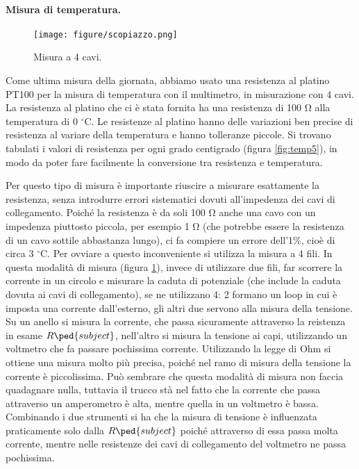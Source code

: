 \paragraph{Misura di temperatura.}

\begin{figure}
    \centering
    \texttt{[image: figure/scopiazzo.png]}
    \caption{Misura a 4 cavi.}
    \label{fig:scopiazzo5}
\end{figure}

Come ultima misura della giornata, abbiamo usato una resistenza al platino PT100 per la misura di temperatura con il multimetro,
in misurazione con 4 cavi. La resistenza al platino che ci è stata fornita ha una resistenza di 100 \si{\ohm} alla temperatura
di 0 $^\circ$C. Le resistenze al platino hanno delle variazioni ben precise di resistenza al variare della temperatura e hanno
tolleranze piccole. Si trovano tabulati i valori di resistenza per ogni grado centigrado (figura \ref{fig:temp5}),
in modo da poter fare facilmente la conversione tra resistenza e temperatura.

Per questo tipo di misura è importante riuscire a misurare esattamente la resistenza, senza introdurre errori sistematici
dovuti all'impedenza dei cavi di collegamento. Poiché la resistenza è da soli 100 \si{\ohm} anche una cavo con un impedenza piuttosto
piccola, per esempio 1 \si{\ohm} (che potrebbe essere la resistenza di un cavo sottile abbastanza lungo), ci fa compiere un errore
dell'1\%, cioè di circa 3 $^\circ$C. Per ovviare a questo inconveniente si utilizza la misura a 4 fili. In questa modalità di misura
(figura \ref{fig:scopiazzo5}),
invece di utilizzare due fili, far scorrere la corrente in un circolo e misurare la caduta di potenziale (che include la caduta dovuta
ai cavi di collegamento), se ne utilizzano 4: 2 formano un loop in cui è imposta una corrente dall'esterno, gli altri due servono
alla misura della tensione. Su un anello si misura la corrente, che passa sicuramente attraverso la reistenza in esame $R\ped{subject}$,
nell'altro si misura la tensione ai capi, utilizzando un voltmetro che fa passare pochissima corrente.
Utilizzando la legge di Ohm si ottiene una misura molto più precisa, poiché
nel ramo di misura della tensione la corrente è piccolissima. Può sembrare che questa modalità di misura non faccia quadagnare nulla,
tuttavia il trucco stà nel fatto che la corrente che passa attraverso un amperometro è alta, mentre quella in un voltmetro è bassa.
Combinando i due strumenti si ha che la misura di tensione è influenzata praticamente solo dalla $R\ped{subject}$ poiché attraverso di
essa passa molta corrente, mentre nelle resistenze dei cavi di collegamento del voltmetro ne passa pochissima.


